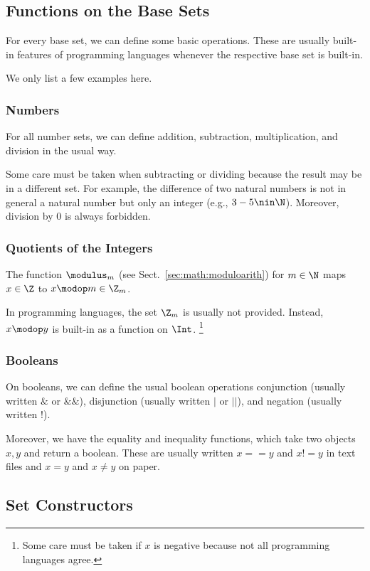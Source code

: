 \subsection{Functions on the Base Sets}\label{sec:math:sets:primfun}

For every base set, we can define some basic operations.
These are usually built-in features of programming languages whenever the respective base set is built-in.

We only list a few examples here.

\subsubsection{Numbers}
For all number sets, we can define addition, subtraction, multiplication, and division in the usual way.

Some care must be taken when subtracting or dividing because the result may be in a different set.
For example, the difference of two natural numbers is not in general a natural number but only an integer (e.g., $3-5\nin\N$).
Moreover, division by $0$ is always forbidden.

\subsubsection{Quotients of the Integers}
The function $\modulus_m$ (see Sect.~\ref{sec:math:moduloarith}) for $m\in \N$ maps $x\in\Z$ to $x\modop m\in\Z_m$.

In programming languages, the set $\Z_m$ is usually not provided.
Instead, $x\modop y$ is built-in as a function on $\Int$.
\footnote{Some care must be taken if $x$ is negative because not all programming languages agree.}

\subsubsection{Booleans}
On booleans, we can define the usual boolean operations conjunction (usually written $\&$ or $\&\&$), disjunction (usually written $|$ or $||$), and negation (usually written $!$).

Moreover, we have the equality and inequality functions, which take two objects $x,y$ and return a boolean.
These are usually written $x==y$ and $x!=y$ in text files and $x=y$ and $x\neq y$ on paper.

\subsection{Set Constructors}\label{sec:math:sets:deriv}


